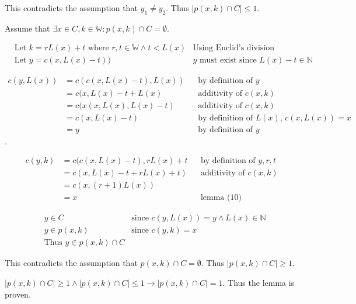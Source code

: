 \documentclass[11pt]{article}
\begin{document}
    This contradicts the assumption that $y_{1}\not = y_{2}$. Thus $|p(x,k)\cap C| \leq 1$.

    Assume that $\exists x \in C,k \in \mathbb{W}: p(x,k)\cap C = \emptyset$.

    \begin{align*}
        & \text{Let $k = rL(x)+t$ where $r,t\in \mathbb{W} \land t<L(x)$} & \text{Using Euclid's division lemma} \\
        & \text{Let $y = c(x,L(x)-t))$} & \text{$y$ must exist since $L(x)-t \in \mathbb{N}$}
    \end{align*}

    \begin{align*}
        \text{$c(y,L(x))$} &= \text{$c(c(x,L(x)-t),L(x))$} && \text{by definition of $y$} \\
        &= \text{$c(x,L(x)-t+L(x)$} && \text{additivity of $c(x,k)$} \\
        &= \text{$c(x(x,L(x),L(x)-t)$} && \text{additivity of $c(x,k)$} \\
        &= \text{$c(x,L(x)-t)$} && \text{by definition of $L(x)$, $c(x,L(x))=x$} \\
        &= \text{$y$} && \text{by definition of $y$}
    \end{align*}.

    \begin{align*}
        \text{$c(y,k)$} &= \text{$c(c(x,L(x)-t),rL(x)+t$} && \text{by definition of $y,r,t$} \\
        &= \text{$c(x,L(x)-t+rL(x)+t)$} && \text{additivity of $c(x,k)$} \\
        &= \text{$c(x,(r+1)L(x))$} && \text{} \\
        &= \text{$x$} && \text{lemma (10)}
    \end{align*}


    \begin{align*}
        & \text{$y \in C$} & \text{since $c(y,L(x))=y \land L(x)\in \mathbb{N}$} \\
        & \text{$y \in p(x,k)$} & \text{since $c(y,k)=x$} \\
        & \text{Thus $y \in p(x,k)\cap C$} & \text{}
    \end{align*}

    This contradicts the assumption that $p(x,k)\cap C = \emptyset$. Thus $|p(x,k)\cap C| \geq 1$.

    $|p(x,k)\cap C| \geq 1 \land |p(x,k)\cap C| \leq 1 \rightarrow |p(x,k)\cap C|=1$. Thus the lemma is proven.
\end{document}
